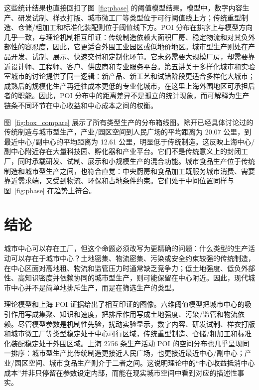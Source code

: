 \documentclass[aps,prl,reprint,superscriptaddress,floatfix,nofootinbib,longbibliography,amsmath,amssymb]{revtex4-2}
\begin{document}
这些统计结果也直接回扣了图~\ref{fig:phase} 的阈值模型结果。模型中，数字内容生产、研发试制、样衣打版、城市微工厂等类型位于可行阈值线上方；传统重型制造、仓储/粗加工和标准化装配则位于阈值线下方。POI 分布在排序上与模型方向几乎一致，与理论机制相互印证：传统制造依赖大面积厂房、稳定物流和对其负外部性的容忍度，因此，它更适合外围工业园区或低地价地区。城市型生产则处在产品开发、试制、展示、快速交付和定制化环节。它未必需要大规模厂房，却需要靠近设计师、工程师、客户、供应商和专业服务平台。第五讲关于多样化城市和实验室城市的讨论提供了同一逻辑：新产品、新工艺和试错阶段更适合多样化大城市；成熟后的规模化生产再迁往成本更低的专业化城市，在这里上海外围地区可承担后者的职能\cite{lec5}。因此，POI 分布中的距离差异不是孤立的统计现象，而可解释为生产链条不同环节在中心收益和中心成本之间的权衡。

图~\ref{fig:box_compare} 展示了所有类型生产的分布箱线图。除开已经具体讨论过的传统制造与城市型生产，产业/园区空间到人民广场的平均距离为 20.07 公里，到最近中心/副中心的平均距离为 12.61 公里，明显低于传统制造。这反映上海中心/副中心附近存在大量科技园、孵化器和产业平台。它们不是传统意义上的封闭工厂，同时承载研发、试制、展示和小规模生产的混合功能。城市食品生产位于传统制造和城市型生产之间，也符合直觉：中央厨房和食品加工既服务城市消费、需要靠近需求端，又受到物流、环保和占地条件约束。它们处于中间位置同样与图~\ref{fig:phase} 在趋势上符合。

\section{结论}

城市中心可以存在工厂，但这个命题必须改写为更精确的问题：什么类型的生产活动可以存在于城市中心？土地密集、物流密集、污染或安全约束较强的传统制造，在中心区面对高地租、物流和监管压力时通常缺乏竞争力；低土地强度、低负外部性、高知识密度并依赖协同的城市型生产，则可能保留在中心附近。因此，现代城市中心并不是简单地排斥生产，而是在筛选生产的类型。

理论模型和上海 POI 证据给出了相互印证的图像。六维阈值模型把城市中心的吸引作用写成集聚、知识和速度，把排斥作用写成土地强度、污染/监管和物流依赖。尽管模型参数是机制性先验，扰动实验显示，数字内容、研发试制、样衣打版和城市微工厂等类型稳定处于中心可行区域，传统重型制造、仓储/粗加工和标准化装配稳定处于外围区域。上海 2756 条生产活动 POI 的空间分布也几乎呈现同一排序：城市型生产比传统制造更接近人民广场，也更接近最近中心/副中心；产业/园区空间、城市食品生产则介于二者之间。这说明理论中的``中心收益抵消中心成本''并非只停留在参数设定内部，而能在现实城市空间中看到对应的描述性事实。
\end{document}
